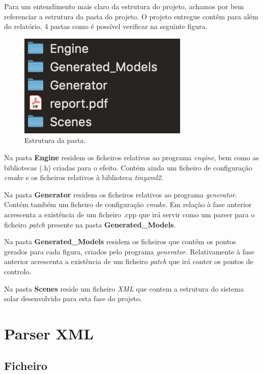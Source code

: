 \documentclass[a4paper]{article}
\begin{document}
Para um entendimento mais claro da estrutura do projeto, achamos por bem referenciar a estrutura da pasta do projeto.
O projeto entregue contêm para além do relatório, 4 pastas como é possível verificar na seguinte figura.

\begin{figure}[H]
\centering
\includegraphics[scale=1.0]{estrutura.png}
\caption{Estrutura da pasta.}
\label{img:estrutura}
\end{figure}

Na pasta \textbf{Engine} residem os ficheiros relativos ao programa \emph{engine}, bem como as bibliotecas (.h) criadas para o efeito. Contém ainda um ficheiro de configuração \emph{cmake} e os ficheiros relativos à biblioteca \emph{tinyxml2}.

Na pasta \textbf{Generator} residem os ficheiros relativos ao programa \emph{generator}. Contém também um ficheiro de configuração \emph{cmake}. Em relação à fase anterior acrescenta a existência de um ficheiro .cpp que irá servir como um parser para o ficheiro \textit{patch} presente na pasta \textbf{Generated\_Models}.

Na pasta \textbf{Generated\_Models} residem os ficheiros que contêm os pontos gerados para cada figura, criados pelo programa \emph{generator}. Relativamente à fase anterior acrescenta a existência de um ficheiro \textit{patch} que irá conter os pontos de controlo.

Na pasta \textbf{Scenes} reside um ficheiro \emph{XML} que contem a estrutura do sistema solar desenvolvido para esta fase do projeto.

\newpage

\section{Parser XML}
\label{sec:parser}

\subsection{Ficheiro}
\label{sec:ficheiro}
\end{document}
